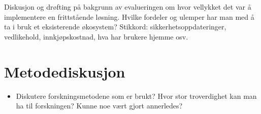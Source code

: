Diskusjon og drøfting på bakgrunn av evalueringen om hvor vellykket det
var å implementere en frittstående løsning. Hvilke fordeler og ulemper
har man med å ta i bruk et eksisterende økosystem? Stikkord:
sikkerhetsoppdateringer, vedlikehold, innkjøpskostnad, hva har brukere
hjemme osv.

\section{Metodediskusjon}\label{metodediskusjon}

\begin{itemize}
\tightlist
\item
  Diskutere forskningsmetodene som er brukt? Hvor stor troverdighet kan
  man ha til forskningen? Kunne noe vært gjort annerledes?
\end{itemize}
\fi

